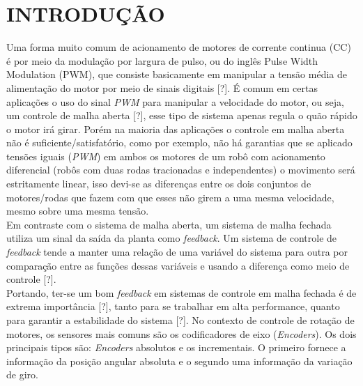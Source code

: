 \section{INTRODUÇÃO}


Uma forma muito comum de acionamento de motores de corrente continua (CC) é por meio da modulação por largura de pulso, ou do inglês Pulse Width Modulation (PWM), que consiste basicamente em manipular a tensão média de alimentação do motor por meio de sinais digitais [?]. É comum em certas aplicações o uso do sinal \emph{PWM} para manipular a velocidade do motor, ou seja, um controle de malha aberta [?], esse tipo de sistema apenas regula o quão rápido o motor irá girar. Porém na maioria das aplicações o controle em malha aberta não é suficiente/satisfatório, como por exemplo, não há garantias que se aplicado tensões iguais (\emph{PWM}) em ambos os motores de um robô com acionamento diferencial (robôs com duas rodas tracionadas e independentes) o movimento será estritamente linear, isso devi-se as diferenças entre os dois conjuntos de motores/rodas que fazem com que esses não girem a uma mesma velocidade, mesmo sobre uma mesma tensão.\\

Em contraste com o sistema de malha aberta, um sistema de malha fechada utiliza um sinal da saída da planta como \emph{feedback}. Um sistema de controle de \emph{feedback} tende a manter uma relação de uma variável do sistema para outra por comparação entre as funções dessas variáveis e usando a diferença como meio de controle [?]. \\

Portando, ter-se um bom \emph{feedback} em sistemas de controle em malha fechada é de extrema importância [?], tanto para se trabalhar em alta performance, quanto para garantir a estabilidade do sistema [?]. No contexto de controle de rotação de motores, os sensores mais comuns são os codificadores de eixo (\emph{Encoders}). Os dois principais tipos são: \emph{Encoders} absolutos e os incrementais. O primeiro fornece a informação da posição angular absoluta e o segundo uma informação da variação de giro. \\

